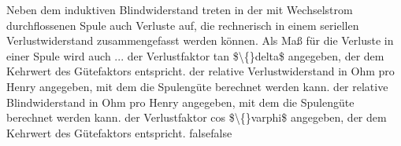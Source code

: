     {Neben dem induktiven Blindwiderstand treten in der mit Wechselstrom durchflossenen Spule auch Verluste auf, die rechnerisch in einem seriellen Verlustwiderstand zusammengefasst werden können. Als Maß für die Verluste in einer Spule wird auch ...}
    {der Verlustfaktor tan \$\textbackslash\{\}delta\$ angegeben, der dem Kehrwert des Gütefaktors entspricht.}
    {der relative Verlustwiderstand in Ohm pro Henry angegeben, mit dem die Spulengüte berechnet werden kann.}
    {der relative Blindwiderstand in Ohm pro Henry angegeben, mit dem die Spulengüte berechnet werden kann.}
    {der Verlustfaktor cos \$\textbackslash\{\}varphi\$ angegeben, der dem Kehrwert des Gütefaktors entspricht.}
    {false}{false}
